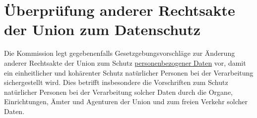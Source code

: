 \chapter{Überprüfung anderer Rechtsakte der Union zum Datenschutz}
\label{ch:98}


Die Kommission legt gegebenenfalls Gesetzgebungsvorschläge zur Änderung anderer Rechtsakte der Union zum Schutz
\hyperref[itm:04-1]{personenbezogener Daten} vor, damit ein einheitlicher und kohärenter Schutz natürlicher Personen bei der Verarbeitung
sichergestellt wird. Dies betrifft insbesondere die Vorschriften zum Schutz natürlicher Personen bei der Verarbeitung
solcher Daten durch die Organe, Einrichtungen, Ämter und Agenturen der Union und zum freien Verkehr solcher Daten.


